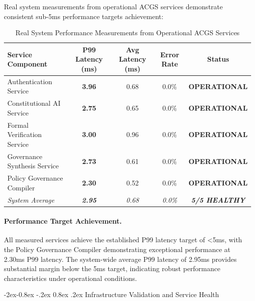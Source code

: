 \documentclass[manuscript,screen,9pt]{acmart}
\makeatletter
\renewcommand\subsubsection{\@startsection{subsubsection}{3}{\z@}%
  {-2ex\@plus -0.8ex \@minus -.2ex}%
  {0.8ex \@plus .2ex}%
  {\normalfont\normalsize\bfseries}}
\newcommand{\tablesize}{\footnotesize}
\newcommand{\tableheader}[1]{\textbf{#1}}
\makeatother
\begin{document}
Real system measurements from operational ACGS services demonstrate consistent sub-5ms performance targets achievement:

\begin{table}[!htb]
\centering
\caption{Real System Performance Measurements from Operational ACGS Services}
\label{tab:real_system_performance}
\tablesize
\begin{tabular}{@{}lcccc@{}}
\toprule
\tableheader{Service Component} & \tableheader{P99 Latency (ms)} & \tableheader{Avg Latency (ms)} & \tableheader{Error Rate} & \tableheader{Status} \\
\midrule
Authentication Service & \textbf{3.96} & 0.68 & 0.0\% & \textbf{OPERATIONAL} \\
Constitutional AI Service & \textbf{2.75} & 0.65 & 0.0\% & \textbf{OPERATIONAL} \\
Formal Verification Service & \textbf{3.00} & 0.96 & 0.0\% & \textbf{OPERATIONAL} \\
Governance Synthesis Service & \textbf{2.73} & 0.61 & 0.0\% & \textbf{OPERATIONAL} \\
Policy Governance Compiler & \textbf{2.30} & 0.52 & 0.0\% & \textbf{OPERATIONAL} \\
\midrule
\textit{System Average} & \textit{\textbf{2.95}} & \textit{0.68} & \textit{0.0\%} & \textit{\textbf{5/5 HEALTHY}} \\
\bottomrule
\end{tabular}
\end{table}

\paragraph{Performance Target Achievement.} All measured services achieve the established P99 latency target of <5ms, with the Policy Governance Compiler demonstrating exceptional performance at 2.30ms P99 latency. The system-wide average P99 latency of 2.95ms provides substantial margin below the 5ms target, indicating robust performance characteristics under operational conditions.

\subsubsection{Infrastructure Validation and Service Health}
\label{subsubsec:infrastructure_validation}
\end{document}
